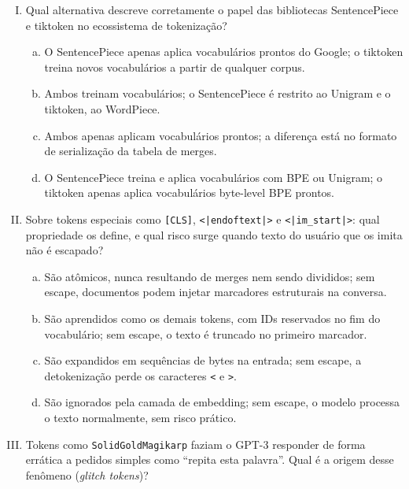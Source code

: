 \documentclass{dlproblemset}
\begin{document}
\begin{enumerate}[I)]
\item Qual alternativa descreve corretamente o papel das bibliotecas SentencePiece
      e tiktoken no ecossistema de tokenização?

\begin{enumerate}[a)]
    \item O SentencePiece apenas aplica vocabulários prontos do Google; o tiktoken
          treina novos vocabulários a partir de qualquer corpus.
    \item Ambos treinam vocabulários; o SentencePiece é restrito ao Unigram e o
          tiktoken, ao WordPiece.
    \item Ambos apenas aplicam vocabulários prontos; a diferença está no formato
          de serialização da tabela de merges.
    \item O SentencePiece treina e aplica vocabulários com BPE ou Unigram; o
          tiktoken apenas aplica vocabulários byte-level BPE prontos.
\end{enumerate}

\item Sobre tokens especiais como \texttt{[CLS]}, \texttt{<|endoftext|>} e
      \texttt{<|im\_start|>}: qual propriedade os define, e qual risco surge quando
      texto do usuário que os imita não é escapado?

\begin{enumerate}[a)]
    \item São atômicos, nunca resultando de merges nem sendo divididos; sem escape,
          documentos podem injetar marcadores estruturais na conversa.
    \item São aprendidos como os demais tokens, com IDs reservados no fim do
          vocabulário; sem escape, o texto é truncado no primeiro marcador.
    \item São expandidos em sequências de bytes na entrada; sem escape, a
          detokenização perde os caracteres \texttt{<} e \texttt{>}.
    \item São ignorados pela camada de embedding; sem escape, o modelo processa o
          texto normalmente, sem risco prático.
\end{enumerate}

\item Tokens como \texttt{\textvisiblespace SolidGoldMagikarp} faziam o GPT-3
      responder de forma errática a pedidos simples como ``repita esta palavra''.
      Qual é a origem desse fenômeno (\emph{glitch tokens})?


\end{enumerate}
\end{document}

